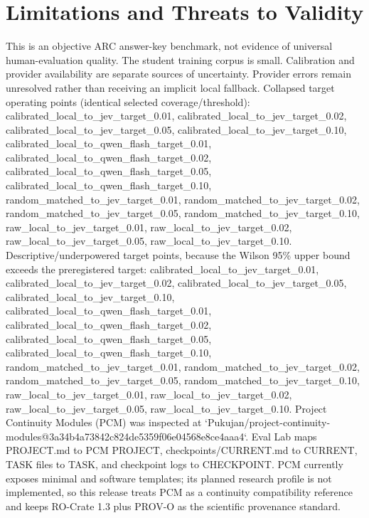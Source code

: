 \documentclass[11pt]{article}
\begin{document}
\section{Limitations and Threats to Validity}
This is an objective ARC answer-key benchmark, not evidence of universal human-evaluation quality. The student training corpus is small. Calibration and provider availability are separate sources of uncertainty. Provider errors remain unresolved rather than receiving an implicit local fallback. Collapsed target operating points (identical selected coverage/threshold): calibrated\_local\_to\_jev\_target\_0.01, calibrated\_local\_to\_jev\_target\_0.02, calibrated\_local\_to\_jev\_target\_0.05, calibrated\_local\_to\_jev\_target\_0.10, calibrated\_local\_to\_qwen\_flash\_target\_0.01, calibrated\_local\_to\_qwen\_flash\_target\_0.02, calibrated\_local\_to\_qwen\_flash\_target\_0.05, calibrated\_local\_to\_qwen\_flash\_target\_0.10, random\_matched\_to\_jev\_target\_0.01, random\_matched\_to\_jev\_target\_0.02, random\_matched\_to\_jev\_target\_0.05, random\_matched\_to\_jev\_target\_0.10, raw\_local\_to\_jev\_target\_0.01, raw\_local\_to\_jev\_target\_0.02, raw\_local\_to\_jev\_target\_0.05, raw\_local\_to\_jev\_target\_0.10. Descriptive/underpowered target points, because the Wilson 95\% upper bound exceeds the preregistered target: calibrated\_local\_to\_jev\_target\_0.01, calibrated\_local\_to\_jev\_target\_0.02, calibrated\_local\_to\_jev\_target\_0.05, calibrated\_local\_to\_jev\_target\_0.10, calibrated\_local\_to\_qwen\_flash\_target\_0.01, calibrated\_local\_to\_qwen\_flash\_target\_0.02, calibrated\_local\_to\_qwen\_flash\_target\_0.05, calibrated\_local\_to\_qwen\_flash\_target\_0.10, random\_matched\_to\_jev\_target\_0.01, random\_matched\_to\_jev\_target\_0.02, random\_matched\_to\_jev\_target\_0.05, random\_matched\_to\_jev\_target\_0.10, raw\_local\_to\_jev\_target\_0.01, raw\_local\_to\_jev\_target\_0.02, raw\_local\_to\_jev\_target\_0.05, raw\_local\_to\_jev\_target\_0.10. Project Continuity Modules (PCM) was inspected at `Pukujan/project-continuity-modules@3a34b4a73842c824de5359f06e04568e8ce4aaa4`. Eval Lab maps PROJECT.md to PCM PROJECT, checkpoints/CURRENT.md to CURRENT, TASK files to TASK, and checkpoint logs to CHECKPOINT. PCM currently exposes minimal and software templates; its planned research profile is not implemented, so this release treats PCM as a continuity compatibility reference and keeps RO-Crate 1.3 plus PROV-O as the scientific provenance standard.
\end{document}
